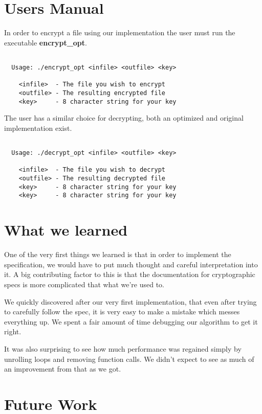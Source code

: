 \documentclass[10pt]{article}
\begin{document}
\section{Users Manual}

\noindent In order to encrypt a file using our implementation the user must run the executable \textbf{encrypt\_opt}.
\begin{verbatim}

  Usage: ./encrypt_opt <infile> <outfile> <key>

    <infile>  - The file you wish to encrypt
    <outfile> - The resulting encrypted file
    <key>     - 8 character string for your key

\end{verbatim}

\noindent The user has a similar choice for decrypting, both an optimized and original implementation exist.
\begin{verbatim}

  Usage: ./decrypt_opt <infile> <outfile> <key>

    <infile>  - The file you wish to decrypt
    <outfile> - The resulting decrypted file
    <key>     - 8 character string for your key
    <key>     - 8 character string for your key

\end{verbatim}

\section{What we learned}
One of the very first things we learned is that in order to implement the specification, we would have to put much thought and careful interpretation into it. A big contributing factor to this is that the documentation for cryptographic specs is more complicated that what we're used to.

We quickly discovered after our very first implementation, that even after trying to carefully follow the spec, it is very easy to make a mistake which messes everything up.  We spent a fair amount of time debugging our algorithm to get it right.


It was also surprising to see how much performance was regained simply by unrolling loops and removing function calls. We didn't expect to see as much of an improvement from that as we got.
\section{Future Work}
\end{document}
